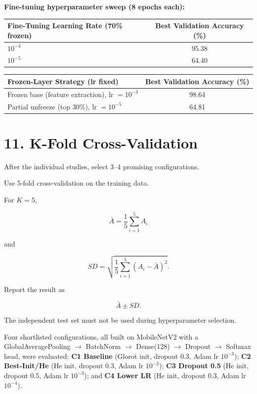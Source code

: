 \documentclass[10pt]{article}
\begin{document}
\textbf{Fine-tuning hyperparameter sweep (8 epochs each):}

\begin{center}
\begin{tabular}{|l|c|}
\hline
Fine-Tuning Learning Rate (70\% frozen) & Best Validation Accuracy (\%)\\
\hline
$10^{-4}$ & 95.38\\
$10^{-5}$ & 64.40\\
\hline
\end{tabular}
\end{center}

\begin{center}
\begin{tabular}{|l|c|}
\hline
Frozen-Layer Strategy (lr fixed) & Best Validation Accuracy (\%)\\
\hline
Frozen base (feature extraction), lr $=10^{-3}$ & 98.64\\
Partial unfreeze (top 30\%), lr $=10^{-5}$ & 64.81\\
\hline
\end{tabular}
\end{center}


\section*{11. K-Fold Cross-Validation}

After the individual studies, select 3--4 promising configurations.

Use 5-fold cross-validation on the training data.

For $K=5$,

\[
\bar{A}=
\frac{1}{5}\sum_{i=1}^{5}A_i
\]

and

\[
SD=
\sqrt{
\frac{1}{5}
\sum_{i=1}^{5}(A_i-\bar{A})^2
}.
\]

Report the result as

\[
\boxed{\bar{A}\pm SD}.
\]

The independent test set must not be used during hyperparameter selection.

Four shortlisted configurations, all built on MobileNetV2 with a
GlobalAveragePooling $\to$ BatchNorm $\to$ Dense(128) $\to$ Dropout $\to$
Softmax head, were evaluated:
\textbf{C1 Baseline} (Glorot init, dropout 0.3, Adam lr $10^{-3}$);
\textbf{C2 Best-Init/He} (He init, dropout 0.3, Adam lr $10^{-3}$);
\textbf{C3 Dropout 0.5} (He init, dropout 0.5, Adam lr $10^{-3}$); and
\textbf{C4 Lower LR} (He init, dropout 0.3, Adam lr $10^{-4}$).
\end{document}
